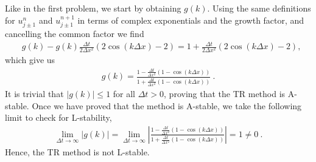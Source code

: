 
\begin{questions}


\begin{solution}

Like in the first problem, we start by obtaining $g(k)$. Using the same definitions for $u_{j\pm1}^n$ and $u_{j\pm1}^{n+1}$ in terms of complex exponentials and the growth factor, and cancelling the common factor we find
\begin{align*}
&g(k) - g(k)\frac{\Delta t}{2\Delta x^2}\left(2\cos(k \Delta x) -2\right) = 1 + \frac{\Delta t}{2\Delta x^2}\left(2\cos(k \Delta x) -2\right),
\end{align*}
which give us
\begin{align*}
g(k) = \frac{1-\frac{\Delta t}{\Delta x^2}\left(1-\cos(k \Delta x) \right)}{1+\frac{\Delta t}{\Delta x^2}\left(1-\cos(k \Delta x) \right)}~.
\end{align*}
It is trivial that $|g(k)| \leq 1$ for all $\Delta t >0$, proving that the TR method is A-stable. Once we have proved that the method is A-stable, we take the following limit to check for L-stability,
\begin{align*}
\lim_{\Delta t \rightarrow \infty} \left|g(k)\right| = \lim_{\Delta t \rightarrow \infty} \left|\frac{1-\frac{\Delta t}{\Delta x^2}\left(1-\cos(k \Delta x) \right)}{1+\frac{\Delta t}{\Delta x^2}\left(1-\cos(k \Delta x) \right)}\right| = 1 \neq 0~.
\end{align*}
Hence, the TR method is not L-stable.
\end{solution}
\end{questions}
